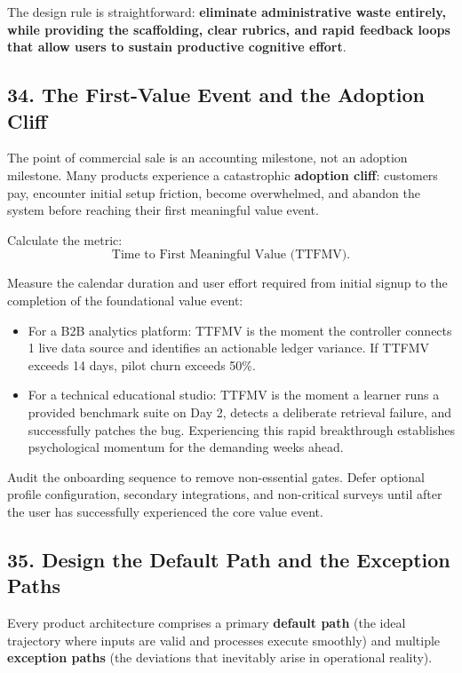 The design rule is straightforward: \textbf{eliminate administrative waste entirely, while providing the scaffolding, clear rubrics, and rapid feedback loops that allow users to sustain productive cognitive effort}.

\subsection*{34. The First-Value Event and the Adoption Cliff}

The point of commercial sale is an accounting milestone, not an adoption milestone. Many products experience a catastrophic \textbf{adoption cliff}: customers pay, encounter initial setup friction, become overwhelmed, and abandon the system before reaching their first meaningful value event.

Calculate the metric:
\begin{equation}
\text{Time to First Meaningful Value (TTFMV)}.
\end{equation}

Measure the calendar duration and user effort required from initial signup to the completion of the foundational value event:
\begin{itemize}
    \item For a B2B analytics platform: TTFMV is the moment the controller connects 1 live data source and identifies an actionable ledger variance. If TTFMV exceeds 14 days, pilot churn exceeds 50\%.
    \item For a technical educational studio: TTFMV is the moment a learner runs a provided benchmark suite on Day 2, detects a deliberate retrieval failure, and successfully patches the bug. Experiencing this rapid breakthrough establishes psychological momentum for the demanding weeks ahead.
\end{itemize}

Audit the onboarding sequence to remove non-essential gates. Defer optional profile configuration, secondary integrations, and non-critical surveys until after the user has successfully experienced the core value event.

\subsection*{35. Design the Default Path and the Exception Paths}

Every product architecture comprises a primary \textbf{default path} (the ideal trajectory where inputs are valid and processes execute smoothly) and multiple \textbf{exception paths} (the deviations that inevitably arise in operational reality).

